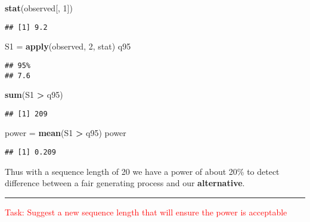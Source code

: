 \documentclass[]{article}
\newenvironment{Shaded}{\begin{snugshade}}{\end{snugshade}}
\newcommand{\KeywordTok}[1]{\textcolor[rgb]{0.13,0.29,0.53}{\textbf{#1}}}
\newcommand{\DecValTok}[1]{\textcolor[rgb]{0.00,0.00,0.81}{#1}}
\newcommand{\StringTok}[1]{\textcolor[rgb]{0.31,0.60,0.02}{#1}}
\newcommand{\OperatorTok}[1]{\textcolor[rgb]{0.81,0.36,0.00}{\textbf{#1}}}
\newcommand{\NormalTok}[1]{#1}
\let\oldrule=\rule
\renewcommand{\rule}[1]{\oldrule{\linewidth}}
\begin{document}
\begin{Shaded}
\begin{Highlighting}[]
\KeywordTok{stat}\NormalTok{(observed[, }\DecValTok{1}\NormalTok{])}
\end{Highlighting}
\end{Shaded}

\begin{verbatim}
## [1] 9.2
\end{verbatim}

\begin{Shaded}
\begin{Highlighting}[]
\NormalTok{S1 =}\StringTok{ }\KeywordTok{apply}\NormalTok{(observed, }\DecValTok{2}\NormalTok{, stat)}
\NormalTok{q95}
\end{Highlighting}
\end{Shaded}

\begin{verbatim}
## 95% 
## 7.6
\end{verbatim}

\begin{Shaded}
\begin{Highlighting}[]
\KeywordTok{sum}\NormalTok{(S1 }\OperatorTok{>}\StringTok{ }\NormalTok{q95)}
\end{Highlighting}
\end{Shaded}

\begin{verbatim}
## [1] 209
\end{verbatim}

\begin{Shaded}
\begin{Highlighting}[]
\NormalTok{power =}\StringTok{ }\KeywordTok{mean}\NormalTok{(S1 }\OperatorTok{>}\StringTok{ }\NormalTok{q95)}
\NormalTok{power}
\end{Highlighting}
\end{Shaded}

\begin{verbatim}
## [1] 0.209
\end{verbatim}

Thus with a sequence length of 20 we have a power of about 20\% to
detect difference between a fair generating process and our
\textbf{alternative}.

\begin{center}\rule{0.5\linewidth}{\linethickness}\end{center}

\textcolor{red}{Task: Suggest a new sequence length that will ensure the power is acceptable}
\end{document}
